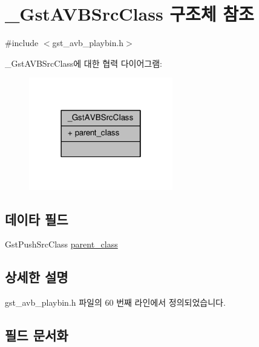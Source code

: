 \hypertarget{struct___gst_a_v_b_src_class}{}\section{\+\_\+\+Gst\+A\+V\+B\+Src\+Class 구조체 참조}
\label{struct___gst_a_v_b_src_class}


{\ttfamily \#include $<$gst\+\_\+avb\+\_\+playbin.\+h$>$}



\+\_\+\+Gst\+A\+V\+B\+Src\+Class에 대한 협력 다이어그램\+:
\nopagebreak
\begin{figure}[H]
\begin{center}
\leavevmode
\includegraphics[width=178pt]{struct___gst_a_v_b_src_class__coll__graph}
\end{center}
\end{figure}
\subsection*{데이타 필드}
\begin{DoxyCompactItemize}
\item 
Gst\+Push\+Src\+Class \hyperlink{struct___gst_a_v_b_src_class_a9b486ae54be8b5539d90a52bef6e91dd}{parent\+\_\+class}
\end{DoxyCompactItemize}


\subsection{상세한 설명}


gst\+\_\+avb\+\_\+playbin.\+h 파일의 60 번째 라인에서 정의되었습니다.



\subsection{필드 문서화}
